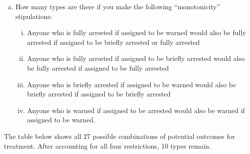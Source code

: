 \documentclass[11pt,notitlepage]{article}\usepackage[]{graphicx}\usepackage[]{color}
\begin{document}
\begin{enumerate}[a)]
\item How many types are there if you make the following ``monotonicity'' stipulations: 
\begin{enumerate}[(i)]
\item Anyone who is fully arrested if assigned to be warned would also be fully arrested if assigned to be briefly arrested or fully arrested
\item Anyone who is fully arrested if assigned to be briefly arrested would also be fully arrested if assigned to be fully arrested
\item Anyone who is briefly arrested if assigned to be warned would also be briefly arrested if assigned to be briefly arrested
\item Anyone who is warned if assigned to be arrested would also be warned if assigned to be warned.
\end{enumerate}
\end{enumerate}

The table below shows all 27 possible combinations of potential outcomes for treatment. After accounting for all four restrictions, 10 types remain.
\end{document}

